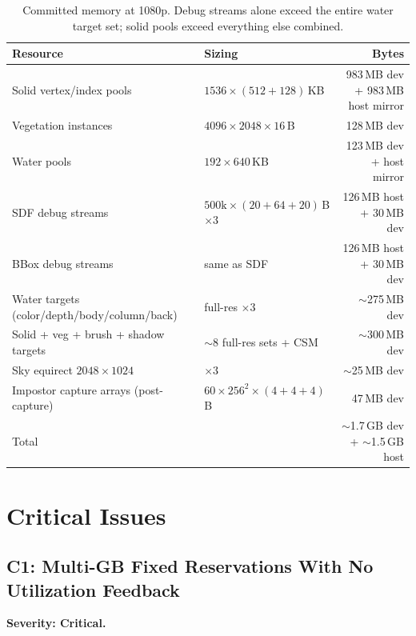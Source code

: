 \documentclass[11pt,a4paper]{article}
\begin{document}
\begin{table}[h]
\centering
\small
\begin{tabular}{@{}llr@{}}
\toprule
\textbf{Resource} & \textbf{Sizing} & \textbf{Bytes} \\
\midrule
Solid vertex/index pools & $1536 \times (512+128)$\,KB & 983\,MB dev + 983\,MB host mirror \\
Vegetation instances & $4096 \times 2048 \times 16$\,B & 128\,MB dev \\
Water pools & $192 \times 640$\,KB & 123\,MB dev + host mirror \\
SDF debug streams & $500\mathrm{k} \times (20+64+20)$\,B $\times 3$ & 126\,MB host + 30\,MB dev \\
BBox debug streams & same as SDF & 126\,MB host + 30\,MB dev \\
Water targets (color/depth/body/column/back) & full-res $\times 3$ & $\sim$275\,MB dev \\
Solid + veg + brush + shadow targets & $\sim$8 full-res sets + CSM & $\sim$300\,MB dev \\
Sky equirect $2048\times1024$ & $\times 3$ & $\sim$25\,MB dev \\
Impostor capture arrays (post-capture) & $60 \times 256^2 \times (4+4+4)$\,B & 47\,MB dev \\
\midrule
Total & & $\sim$1.7\,GB dev + $\sim$1.5\,GB host \\
\bottomrule
\end{tabular}
\caption{Committed memory at 1080p. Debug streams alone exceed the entire
water target set; solid pools exceed everything else combined.}
\end{table}

\section{Critical Issues}

\subsection{C1: Multi-GB Fixed Reservations With No Utilization Feedback}
\label{sec:c1}

\textbf{Severity: Critical.}
\end{document}
